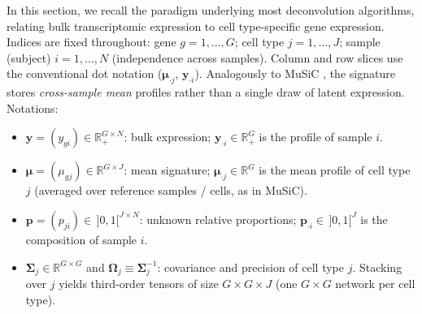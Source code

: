 \documentclass[pdflatex, sn-nature]{sn-jnl}
\theoremstyle{thmstyleone}%
\theoremstyle{thmstyletwo}%
\theoremstyle{thmstylethree}%
\begin{document}
    In this section, we recall the paradigm underlying most deconvolution
    algorithms, relating bulk transcriptomic expression to cell type-specific
    gene expression. Indices are fixed throughout: gene $g=1,\ldots,G$;
    cell type $j=1,\ldots,J$; sample (subject) $i=1,\ldots,N$ (independence
    across samples). Column and row slices use the conventional dot notation
    ($\boldsymbol{\mu}_{\cdot j}$, $\boldsymbol{y}_{\cdot i}$). Analogously to
    MuSiC \cite{wangBulkTissueCell2019}, the signature stores
    \emph{cross-sample mean} profiles rather than a single draw of latent
    expression. Notations:
    \begin{itemize}
        \item $\boldsymbol{y}=(y_{gi})\in\mathbb{R}_{+}^{G\times N}$: bulk
            expression; $\boldsymbol{y}_{\cdot i}\in\mathbb{R}_{+}^{G}$ is the
            profile of sample $i$.

        \item $\boldsymbol{\mu}=(\mu_{gj})\in\mathbb{R}^{G\times J}$: mean
            signature; $\boldsymbol{\mu}_{\cdot j}\in\mathbb{R}^{G}$ is the
            mean profile of cell type $j$ (averaged over reference samples /
            cells, as in MuSiC).

        \item $\boldsymbol{p}=(p_{ji})\in\,]0,1[^{J\times N}$: unknown relative
            proportions; $\boldsymbol{p}_{\cdot i}\in\,]0,1[^{J}$ is the
            composition of sample $i$.

        \item $\boldsymbol{\Sigma}_{j}\in\mathbb{R}^{G\times G}$ and
            $\boldsymbol{\Omega}_{j}\equiv\boldsymbol{\Sigma}_{j}^{-1}$:
            covariance and precision of cell type $j$. Stacking over $j$
            yields third-order tensors of size $G\times G\times J$
            (one $G\times G$ network per cell type).
    \end{itemize}
\end{document}
